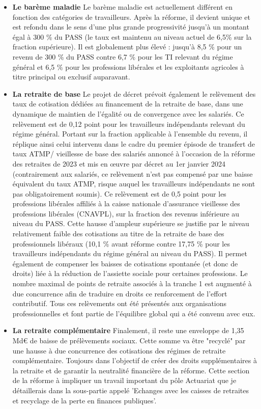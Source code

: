 \begin{itemize}

    \item \textbf{Le barème maladie} Le barème maladie est actuellement différent en fonction des catégories de travailleurs. Après la réforme, il devient unique et est refondu dans le sens d’une plus grande progressivité jusqu’à un montant égal à 300 \% du PASS (le taux est maintenu au niveau actuel de 6,5\% sur la fraction supérieure). Il est globalement plus élevé : jusqu’à 8,5 \% pour un revenu de 300 \% du PASS contre 6,7 \% pour les TI relevant du régime général et 6,5 \% pour les professions libérales et les exploitants agricoles à titre principal ou exclusif auparavant. 

    \item \textbf{La retraite de base} Le projet de décret prévoit également le relèvement des taux de cotisation dédiées au financement de la retraite de base, dans une dynamique de maintien de l’égalité ou de convergence avec les salariés. Ce relèvement est de 0,12 point pour les travailleurs indépendants relevant du régime général. Portant sur la fraction applicable à l’ensemble du revenu, il réplique ainsi celui intervenu dans le cadre du premier épisode de transfert de taux ATMP/ vieillesse de base des salariés annoncé à l’occasion de la réforme des retraites de 2023 et mis en œuvre par décret au 1er janvier 2024 (contrairement aux salariés, ce relèvement n’est pas compensé par une baisse équivalent du taux ATMP, risque auquel les travailleurs indépendants ne sont pas obligatoirement soumis). Ce relèvement est de 0,5 point pour les professions libérales affiliés à la caisse nationale d'assurance vieillesse des professions libérales (CNAVPL), sur la fraction des revenus inférieure au niveau du PASS. Cette hausse d’ampleur supérieure se justifie par le niveau relativement faible des cotisations au titre de la retraite de base des professionnels libéraux (10,1 \% avant réforme contre 17,75 \% pour les travailleurs indépendants du régime général au niveau du PASS). Il permet également de compenser les baisses de cotisations spontanée (et donc de droits) liée à la réduction de l’assiette sociale pour certaines professions. Le nombre maximal de points de retraite associés à la tranche 1 est augmenté à due concurrence afin de traduire en droits ce renforcement de l’effort contributif. Tous ces relèvements ont été présentés aux organisations professionnelles et font partie de l’équilibre global qui a été convenu avec eux. 
    
    \item \textbf{La retraite complémentaire} Finalement, il reste une enveloppe de 1,35 Md€ de baisse de prélèvements sociaux. Cette somme va être "recyclé" par une hausse à due concurrence des cotisations des régimes de retraite complémentaire. Toujours dans l'objectif de créer des droits supplémentaires à la retraite et de garantir la neutralité financière de la réforme. Cette section de la réforme à impliquer un travail important du pôle Actuariat que je détaillerais dans la sous-partie appelé 'Echanges avec les caisses de retraites et recyclage de la perte en finances publiques'.

\end{itemize}


